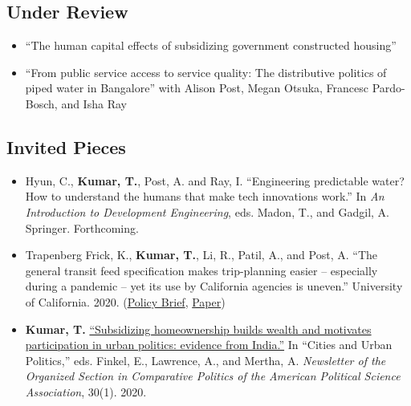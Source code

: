 \documentclass[10pt]{article}
\begin{document}
\subsection*{Under Review}

\begin{itemize}

	\item[]``The human capital effects of subsidizing government constructed housing'' 

	
		\item[]``From public service access to service quality: The distributive politics of piped water in Bangalore'' with Alison Post, Megan Otsuka, Francesc Pardo-Bosch, and Isha Ray 
	
		\end{itemize}
		



\subsection*{Invited Pieces}
\begin{itemize}
	\item[]Hyun, C., \textbf{Kumar, T.}, Post, A. and Ray, I. ``Engineering predictable water? How to understand the humans that make tech innovations work.'' In \textit{An Introduction to Development Engineering}, eds. Madon, T., and Gadgil, A. Springer. Forthcoming.
\item[]Trapenberg Frick, K., \textbf{Kumar, T.}, Li, R., Patil, A., and Post, A. ``The general transit feed specification makes trip-planning easier -- especially during a pandemic -- yet its use by California agencies is uneven.'' University of California. 2020. (\href{https://escholarship.org/uc/item/9j94q60f}{Policy Brief}, \href{https://escholarship.org/uc/item/1f29b7dk}{Paper}) 
\item[]\textbf{Kumar, T.} \href{https://www.comparativepoliticsnewsletter.org/wp-content/uploads/2020/05/Spring-Newsletter-2020.pdf}{``Subsidizing homeownership builds wealth and motivates participation in urban politics: evidence from India.''}  In ``Cities and Urban Politics,'' eds. Finkel, E.,  Lawrence, A.,  and Mertha, A.  \textit{Newsletter of the Organized Section in Comparative Politics of the American Political Science Association}, 30(1). 2020.
	\end{itemize}
	
\end{document}
